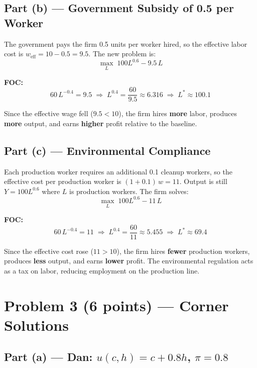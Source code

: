 \documentclass[12pt]{article}
\begin{document}
\subsection*{Part (b) --- Government Subsidy of 0.5 per Worker}

The government pays the firm 0.5 units per worker hired, so the effective
labor cost is $w_{\text{eff}} = 10 - 0.5 = 9.5$. The new problem is:
\[
    \max_{L} \; 100L^{0.6} - 9.5\,L
\]

\textbf{FOC:}
\[
    60\,L^{-0.4} = 9.5
    \;\Longrightarrow\;
    L^{0.4} = \frac{60}{9.5} \approx 6.316
    \;\Longrightarrow\;
    L^* \approx 100.1
\]

Since the effective wage fell ($9.5 < 10$), the firm hires \textbf{more}
labor, produces \textbf{more} output, and earns \textbf{higher} profit
relative to the baseline.

\subsection*{Part (c) --- Environmental Compliance}

Each production worker requires an additional 0.1 cleanup workers, so the
effective cost per production worker is $(1+0.1)\,w = 11$. Output is still
$Y = 100L^{0.6}$ where $L$ is production workers. The firm solves:
\[
    \max_{L} \; 100L^{0.6} - 11\,L
\]

\textbf{FOC:}
\[
    60\,L^{-0.4} = 11
    \;\Longrightarrow\;
    L^{0.4} = \frac{60}{11} \approx 5.455
    \;\Longrightarrow\;
    L^* \approx 69.4
\]

Since the effective cost rose ($11 > 10$), the firm hires \textbf{fewer}
production workers, produces \textbf{less} output, and earns \textbf{lower}
profit. The environmental regulation acts as a tax on labor, reducing
employment on the production line.

\section*{Problem 3 (6 points) --- Corner Solutions}

\subsection*{Part (a) --- Dan: $u(c,h) = c + 0.8h$, $\pi = 0.8$}
\end{document}
